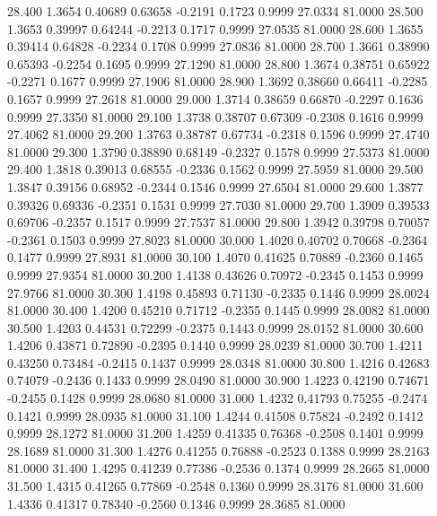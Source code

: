   28.400   1.3654   0.40689   0.63658  -0.2191   0.1723   0.9999  27.0334  81.0000
  28.500   1.3653   0.39997   0.64244  -0.2213   0.1717   0.9999  27.0535  81.0000
  28.600   1.3655   0.39414   0.64828  -0.2234   0.1708   0.9999  27.0836  81.0000
  28.700   1.3661   0.38990   0.65393  -0.2254   0.1695   0.9999  27.1290  81.0000
  28.800   1.3674   0.38751   0.65922  -0.2271   0.1677   0.9999  27.1906  81.0000
  28.900   1.3692   0.38660   0.66411  -0.2285   0.1657   0.9999  27.2618  81.0000
  29.000   1.3714   0.38659   0.66870  -0.2297   0.1636   0.9999  27.3350  81.0000
  29.100   1.3738   0.38707   0.67309  -0.2308   0.1616   0.9999  27.4062  81.0000
  29.200   1.3763   0.38787   0.67734  -0.2318   0.1596   0.9999  27.4740  81.0000
  29.300   1.3790   0.38890   0.68149  -0.2327   0.1578   0.9999  27.5373  81.0000
  29.400   1.3818   0.39013   0.68555  -0.2336   0.1562   0.9999  27.5959  81.0000
  29.500   1.3847   0.39156   0.68952  -0.2344   0.1546   0.9999  27.6504  81.0000
  29.600   1.3877   0.39326   0.69336  -0.2351   0.1531   0.9999  27.7030  81.0000
  29.700   1.3909   0.39533   0.69706  -0.2357   0.1517   0.9999  27.7537  81.0000
  29.800   1.3942   0.39798   0.70057  -0.2361   0.1503   0.9999  27.8023  81.0000
  30.000   1.4020   0.40702   0.70668  -0.2364   0.1477   0.9999  27.8931  81.0000
  30.100   1.4070   0.41625   0.70889  -0.2360   0.1465   0.9999  27.9354  81.0000
  30.200   1.4138   0.43626   0.70972  -0.2345   0.1453   0.9999  27.9766  81.0000
  30.300   1.4198   0.45893   0.71130  -0.2335   0.1446   0.9999  28.0024  81.0000
  30.400   1.4200   0.45210   0.71712  -0.2355   0.1445   0.9999  28.0082  81.0000
  30.500   1.4203   0.44531   0.72299  -0.2375   0.1443   0.9999  28.0152  81.0000
  30.600   1.4206   0.43871   0.72890  -0.2395   0.1440   0.9999  28.0239  81.0000
  30.700   1.4211   0.43250   0.73484  -0.2415   0.1437   0.9999  28.0348  81.0000
  30.800   1.4216   0.42683   0.74079  -0.2436   0.1433   0.9999  28.0490  81.0000
  30.900   1.4223   0.42190   0.74671  -0.2455   0.1428   0.9999  28.0680  81.0000
  31.000   1.4232   0.41793   0.75255  -0.2474   0.1421   0.9999  28.0935  81.0000
  31.100   1.4244   0.41508   0.75824  -0.2492   0.1412   0.9999  28.1272  81.0000
  31.200   1.4259   0.41335   0.76368  -0.2508   0.1401   0.9999  28.1689  81.0000
  31.300   1.4276   0.41255   0.76888  -0.2523   0.1388   0.9999  28.2163  81.0000
  31.400   1.4295   0.41239   0.77386  -0.2536   0.1374   0.9999  28.2665  81.0000
  31.500   1.4315   0.41265   0.77869  -0.2548   0.1360   0.9999  28.3176  81.0000
  31.600   1.4336   0.41317   0.78340  -0.2560   0.1346   0.9999  28.3685  81.0000
